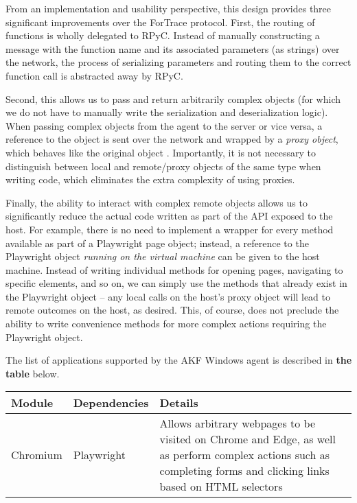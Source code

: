 From an implementation and usability perspective, this design provides
three significant improvements over the ForTrace protocol. First, the
routing of functions is wholly delegated to RPyC. Instead of manually
constructing a message with the function name and its associated
parameters (as strings) over the network, the process of serializing
parameters and routing them to the correct function call is abstracted
away by RPyC.

Second, this allows us to pass and return arbitrarily complex objects
(for which we do not have to manually write the serialization and
deserialization logic). When passing complex objects from the agent to
the server or vice versa, a reference to the object is sent over the
network and wrapped by a \emph{proxy object}, which behaves like the
original object \cite{TheoryOperationRPyC}. Importantly, it is not
necessary to distinguish between local and remote/proxy objects of the
same type when writing code, which eliminates the extra complexity of
using proxies.

Finally, the ability to interact with complex remote objects allows us
to significantly reduce the actual code written as part of the API
exposed to the host. For example, there is no need to implement a
wrapper for every method available as part of a Playwright page object;
instead, a reference to the Playwright object \emph{running on the
virtual machine} can be given to the host machine. Instead of writing
individual methods for opening pages, navigating to specific elements,
and so on, we can simply use the methods that already exist in the
Playwright object -- any local calls on the host's proxy object will
lead to remote outcomes on the host, as desired. This, of course, does
not preclude the ability to write convenience methods for more complex
actions requiring the Playwright object.

The list of applications supported by the AKF Windows agent is described
in \textbf{the table} below.

\begin{longtable}[]{@{}
  >{\raggedright\arraybackslash}p{}
  >{\raggedright\arraybackslash}p{}
  >{\raggedright\arraybackslash}p{}@{}}
\toprule\noalign{}
\begin{minipage}[b]{\linewidth}\raggedright
Module
\end{minipage} & \begin{minipage}[b]{\linewidth}\raggedright
Dependencies
\end{minipage} & \begin{minipage}[b]{\linewidth}\raggedright
Details
\end{minipage} \\
\midrule\noalign{}
\endhead
\bottomrule\noalign{}
\endlastfoot
Chromium & Playwright \cite{MicrosoftPlaywrightpython2025} & Allows
arbitrary webpages to be visited on Chrome and Edge, as well as perform
complex actions such as completing forms and clicking links based on
HTML selectors \\
\end{longtable}

